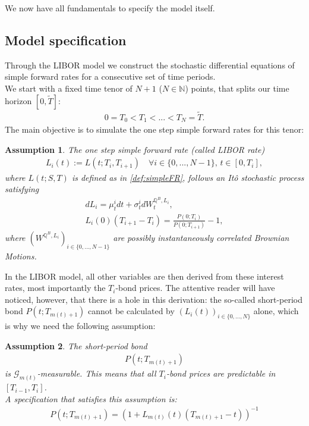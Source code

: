 \documentclass[12pt]{article}
\newtheorem{assumption}{Assumption}[section]
\begin{document}
	We now have all fundamentals to specify the model itself.
	
	\subsection{Model specification}\label{sec:libModel}
	Through the LIBOR model we construct the stochastic differential equations of simple forward rates for a consecutive set of time periods.\\
	We start with a fixed time tenor of $N+1$ ($N \in \mathbb{N}$) points, that splits our time horizon $[0,\tilde{T}]$:
	\begin{align*}
		0 = T_0 < T_1 < ... < T_N = \tilde{T}.
	\end{align*}
	The main objective is to simulate the one step simple forward rates for this tenor:
	\begin{assumption}\label{as:LIBORisItoProcess}
		The one step simple forward rate (called LIBOR rate)
		\begin{align*}
			L_i(t) := L(t;T_i, T_{i+1}) \quad \forall i \in \{0, ..., N-1\}\text{, } t\in[0,T_i],
		\end{align*}
		where $L(t;S, T)$ is defined as in \cref{def:simpleFR},
		follows an Itô stochastic process satisfying
		\begin{align}
			dL_i = \mu^i_t dt + \sigma^i_t dW^{\mathbb{Q}^B, L_i}_t,\label{eq:LMMSDE}\\
			L_i(0)(T_{i+1} - T_i) = \frac{P(0;T_i)}{P(0;T_{i+1})} - 1,
		\end{align}
		where $(W^{\mathbb{Q}^B, L_i})_{i\in \{0, ..., N-1\}}$ are possibly instantaneously correlated Brownian Motions.
	\end{assumption}
	In the LIBOR model, all other variables are then derived from these interest rates, most importantly the $T_i$-bond prices. The attentive reader will have noticed, however, that there is a hole in this derivation: the so-called short-period bond $P(t;T_{m(t)+1})$ cannot be calculated by $\left(L_i(t)\right)_{i\in\{0, ..., N\}}$ alone, which is why we need the following assumption:
	\begin{assumption}\label{as:LMMShortPeriodBond}
		The short-period bond
		\begin{align*}
			P(t;T_{m(t)+1})
		\end{align*}
		is $\mathcal{G}_{m(t)}$-measurable. This means that all $T_i$-bond prices are predictable in $[T_{i-1},T_i]$.\\
		A specification that satisfies this assumption is:
		\begin{align*}
			P(t;T_{m(t)+1}) = \left(1 + L_{m(t)}(t)\left(T_{m(t)+1} - t\right)\right)^{-1}
		\end{align*}
	\end{assumption}
\end{document}
